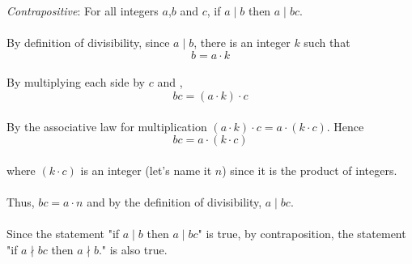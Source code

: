 \documentclass[a4paper,11pt]{article}
\begin{document}
\begin{enumerate}
        \textit{Contrapositive}: For all integers $a$,$b$ and $c$, if $a \mid b$ then $a \mid bc$. \\\\
        By definition of divisibility, since $a \mid b$, there is an integer $k$ such that
        \begin{equation*}
        b = a \cdot k
        \end{equation*} \\
        By multiplying each side by $c$ and ,
        \begin{equation*}
        bc = (a \cdot k) \cdot c
        \end{equation*} \\
        By the associative law for multiplication $(a \cdot k) \cdot c = a \cdot (k \cdot c)$. Hence
        \begin{equation*}
        bc = a \cdot (k \cdot c)
        \end{equation*} \\
        where $(k \cdot c)$ is an integer (let's name it $n$) since it is the product of integers. \\\\
        Thus, $bc = a \cdot n$ and by the definition of divisibility, $a \mid bc$. \\\\
        Since the statement "if $a \mid b$ then $a \mid bc$" is true, by contraposition, the statement "if $a \nmid bc$ then $a \nmid b$." is also true.
\end{enumerate}
\end{document}
